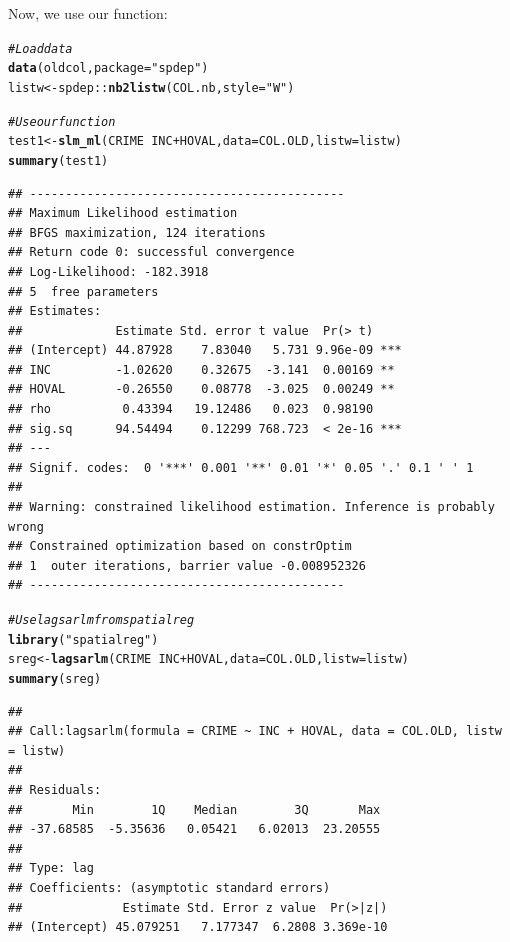 \documentclass[english,12pt]{book}\usepackage[]{graphicx}\usepackage[]{xcolor}
\makeatletter
\newcommand{\hlstr}[1]{\textcolor[rgb]{0.192,0.494,0.8}{#1}}%
\newcommand{\hlcom}[1]{\textcolor[rgb]{0.678,0.584,0.686}{\textit{#1}}}%
\newcommand{\hlopt}[1]{\textcolor[rgb]{0,0,0}{#1}}%
\newcommand{\hlstd}[1]{\textcolor[rgb]{0.345,0.345,0.345}{#1}}%
\newcommand{\hlkwb}[1]{\textcolor[rgb]{0.69,0.353,0.396}{#1}}%
\newcommand{\hlkwc}[1]{\textcolor[rgb]{0.333,0.667,0.333}{#1}}%
\newcommand{\hlkwd}[1]{\textcolor[rgb]{0.737,0.353,0.396}{\textbf{#1}}}%
\newenvironment{kframe}{%
 \def\at@end@of@kframe{}%
 \ifinner\ifhmode%
  \def\at@end@of@kframe{\end{minipage}}%
  \begin{minipage}{\columnwidth}%
 \fi\fi%
 \def\FrameCommand##1{\hskip\@totalleftmargin \hskip-\fboxsep
 \colorbox{shadecolor}{##1}\hskip-\fboxsep
     \hskip-\linewidth \hskip-\@totalleftmargin \hskip\columnwidth}%
 \MakeFramed {\advance\hsize-\width
   \@totalleftmargin\z@ \linewidth\hsize
   \@setminipage}}%
 {\par\unskip\endMakeFramed%
 \at@end@of@kframe}
\newenvironment{knitrout}{}{} %
\makeatother
\begin{document}
Now, we use our function:

\begin{knitrout}
\color{fgcolor}\begin{kframe}
\begin{alltt}
\hlcom{# Load data }
\hlkwd{data}\hlstd{(oldcol,} \hlkwc{package}\hlstd{=}\hlstr{"spdep"}\hlstd{)}
\hlstd{listw} \hlkwb{<-} \hlstd{spdep}\hlopt{::}\hlkwd{nb2listw}\hlstd{(COL.nb,} \hlkwc{style} \hlstd{=} \hlstr{"W"}\hlstd{)}

\hlcom{# Use our function }
\hlstd{test1} \hlkwb{<-} \hlkwd{slm_ml}\hlstd{(CRIME} \hlopt{~} \hlstd{INC} \hlopt{+} \hlstd{HOVAL,} \hlkwc{data} \hlstd{= COL.OLD,} \hlkwc{listw} \hlstd{= listw)}
\hlkwd{summary}\hlstd{(test1)}
\end{alltt}
\begin{verbatim}
## --------------------------------------------
## Maximum Likelihood estimation
## BFGS maximization, 124 iterations
## Return code 0: successful convergence 
## Log-Likelihood: -182.3918 
## 5  free parameters
## Estimates:
##             Estimate Std. error t value  Pr(> t)    
## (Intercept) 44.87928    7.83040   5.731 9.96e-09 ***
## INC         -1.02620    0.32675  -3.141  0.00169 ** 
## HOVAL       -0.26550    0.08778  -3.025  0.00249 ** 
## rho          0.43394   19.12486   0.023  0.98190    
## sig.sq      94.54494    0.12299 768.723  < 2e-16 ***
## ---
## Signif. codes:  0 '***' 0.001 '**' 0.01 '*' 0.05 '.' 0.1 ' ' 1
## 
## Warning: constrained likelihood estimation. Inference is probably wrong
## Constrained optimization based on constrOptim 
## 1  outer iterations, barrier value -0.008952326 
## --------------------------------------------
\end{verbatim}
\begin{alltt}
\hlcom{# Use lagsarlm from spatialreg}
\hlkwd{library}\hlstd{(}\hlstr{"spatialreg"}\hlstd{)}
\hlstd{sreg} \hlkwb{<-} \hlkwd{lagsarlm}\hlstd{(CRIME} \hlopt{~} \hlstd{INC} \hlopt{+} \hlstd{HOVAL,} \hlkwc{data} \hlstd{= COL.OLD,} \hlkwc{listw} \hlstd{= listw)}
\hlkwd{summary}\hlstd{(sreg)}
\end{alltt}
\begin{verbatim}
## 
## Call:lagsarlm(formula = CRIME ~ INC + HOVAL, data = COL.OLD, listw = listw)
## 
## Residuals:
##       Min        1Q    Median        3Q       Max 
## -37.68585  -5.35636   0.05421   6.02013  23.20555 
## 
## Type: lag 
## Coefficients: (asymptotic standard errors) 
##              Estimate Std. Error z value  Pr(>|z|)
## (Intercept) 45.079251   7.177347  6.2808 3.369e-10

\end{verbatim}
\end{kframe}
\end{knitrout}
\end{document}
